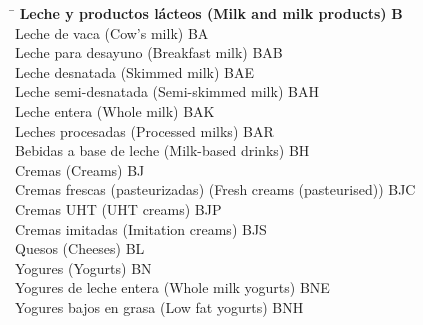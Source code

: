 \begin{small}
    \vspace{-1.25cm}

    \begin{tabbing}
    \hspace{15cm} \= \hspace{0cm} \kill
        \textbf{Leche y productos lácteos (Milk and milk products)} \> \textbf{B} \\
            \hspace{0.5cm}Leche de vaca (Cow's milk) \> BA \\
                \hspace{1cm}Leche para desayuno (Breakfast milk) \> BAB \\
                \hspace{1cm}Leche desnatada (Skimmed milk) \> BAE \\
                \hspace{1cm}Leche semi-desnatada (Semi-skimmed milk) \> BAH \\
                \hspace{1cm}Leche entera (Whole milk) \> BAK \\
                \hspace{1cm}Leches procesadas (Processed milks) \> BAR \\
            \hspace{0.5cm}Bebidas a base de leche (Milk-based drinks) \> BH \\
            \hspace{0.5cm}Cremas (Creams) \> BJ \\
                \hspace{1cm}Cremas frescas (pasteurizadas) (Fresh creams (pasteurised)) \> BJC \\                
                \hspace{1cm}Cremas UHT (UHT creams) \> BJP \\
                \hspace{1cm}Cremas imitadas (Imitation creams) \> BJS \\
            \hspace{0.5cm}Quesos (Cheeses) \> BL \\
            \hspace{0.5cm}Yogures (Yogurts) \> BN \\
                \hspace{1cm}Yogures de leche entera (Whole milk yogurts) \> BNE \\
                \hspace{1cm}Yogures bajos en grasa (Low fat yogurts) \> BNH \\

\end{tabbing}
\end{small}

